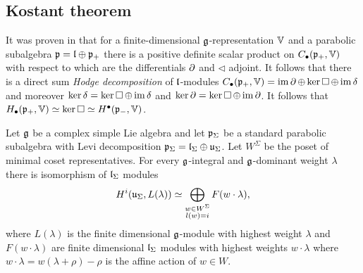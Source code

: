 \documentclass[12pt,a4paper,final]{report}
\begin{document}
\subsection{Kostant theorem}



It was proven in \cite{kostant_lie_1961} that for a finite-dimensional $\mathfrak{g}$-representation $\mathbb{V}$ and a parabolic subalgebra $\mathfrak{p} = \mathfrak{l} \oplus \mathfrak{p}_+$ there is a positive definite scalar product on $C_\bullet(\mathfrak{p}_+,\mathbb{V})$ with respect to which are the differentials $\operatorname{\partial}$ and $\lhd$ adjoint. It follows that there is a direct sum \emph{Hodge decomposition} of $\mathfrak{l}$-modules $C_\bullet(\mathfrak{p}_+,\mathbb{V})=\operatorname{\mathrm{im}} \operatorname{\partial} \oplus  \ker \operatorname{\square} \oplus \operatorname{\mathrm{im}} \operatorname{\delta}$ and moreover $\ker \operatorname{\delta} = \ker \operatorname{\square} \oplus \operatorname{\mathrm{im}} \operatorname{\delta}$ and $\ker \operatorname{\partial} = \ker \operatorname{\square} \oplus \operatorname{\mathrm{im}} \operatorname{\partial}$. It follows that $H_\bullet(\mathfrak{p}_+,\mathbb{V})\simeq \ker \operatorname{\square} \simeq H^\bullet(\mathfrak{p}_-,\mathbb{V})$.

\begin{theorem}
	Let $\mathfrak{g}$ be a complex simple Lie algebra and let $\mathfrak{p}_\Sigma$ be a standard parabolic subalgebra with Levi decomposition $\mathfrak{p}_\Sigma = \mathfrak{l}_\Sigma \oplus \mathfrak{u}_\Sigma$. Let $W^\Sigma$ be the poset of minimal coset representatives. For every $\mathfrak{g}$-integral and $\mathfrak{g}$-dominant weight $\lambda$ there is isomorphism of $\mathfrak{l}_\Sigma$ modules
	\begin{equation}
		 H^i(\mathfrak{u}_\Sigma, L(\lambda))\simeq \bigoplus_{\substack{w\in W^{\Sigma}\\ l(w) = i}} F(w \cdot \lambda),
	\end{equation}
	where $L(\lambda)$ is the finite dimensional $\mathfrak{g}$-module with highest weight $\lambda$ and $F(w\cdot \lambda)$ are finite dimensional $\mathfrak{l}_\Sigma$ modules with highest weights $w \cdot \lambda$ where $w \cdot \lambda = w(\lambda + \rho) - \rho$ is the affine action of $w \in W.$
\end{theorem}
\end{document}

